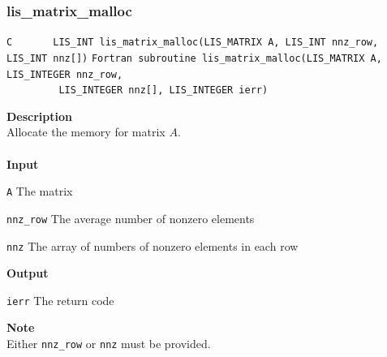 \documentclass[a4paper]{article}
\newcommand{\namelistlabel}[1]{\mbox{#1}\hfill}
\newenvironment{namelist}[1]{%
\begin{list}{}
  {\let\makelabel\namelistlabel
  \settowidth{\labelwidth}{#1}
  \setlength{\leftmargin}{1.1\labelwidth}}
  }{%
\end{list}}
\begin{document}
\subsubsection{lis\_matrix\_malloc}
\begin{screen}
\verb|C       LIS_INT lis_matrix_malloc(LIS_MATRIX A, LIS_INT nnz_row, LIS_INT nnz[])|
\verb|Fortran subroutine lis_matrix_malloc(LIS_MATRIX A, LIS_INTEGER nnz_row,|\\
\verb|         LIS_INTEGER nnz[], LIS_INTEGER ierr)|
\end{screen}
{\bf Description}\\
\indent
Allocate the memory for matrix $A$.
\\ \\
\noindent
{\bf Input}
\begin{namelist}{XXXXXXXXXXXXXXXXXXXX}
\item[\tt A] The matrix
\item[\tt nnz\_row] The average number of nonzero elements
\item[\tt nnz] The array of numbers of nonzero elements in each row
\end{namelist}
{\bf Output}
\begin{namelist}{XXXXXXXXXXXXXXXXXXXX}
\item[\tt ierr] The return code
\end{namelist}
{\bf Note}\\
\indent
Either \verb|nnz_row| or \verb|nnz| must be provided.

\newpage
\end{document}
